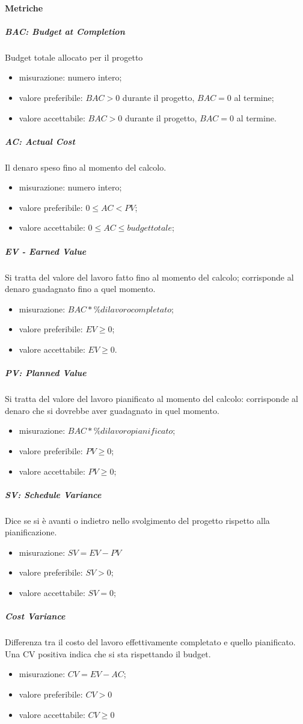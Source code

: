 		\paragraph{Metriche}
			\subparagraph{BAC: Budget at Completion}
			Budget totale allocato per il progetto
			\begin{itemize}
				\item misurazione: numero intero;
				\item valore preferibile: $BAC>0$ durante il progetto, $BAC=0$ al termine;
				\item valore accettabile: $BAC>0$ durante il progetto, $BAC=0$ al termine.
			\end{itemize}
			\subparagraph{AC: Actual Cost}
			Il denaro speso fino al momento del calcolo.
			\begin{itemize}
				\item  misurazione: numero intero;
				\item  valore preferibile: $0 \leq AC < PV$;
				\item  valore accettabile: $0 \leq AC \leq budget totale$;
			\end{itemize}
			\subparagraph{EV - Earned Value}
			Si tratta del valore del lavoro fatto fino al momento del calcolo; corrisponde al denaro guadagnato fino a quel momento.
			\begin{itemize}
				\item  misurazione: $BAC * \% di lavoro completato$;
				\item  valore preferibile: $EV \geq 0$;
				\item  valore accettabile: $EV \geq 0$.
			\end{itemize}
			\subparagraph{PV: Planned Value}
			Si tratta del valore del lavoro pianificato al momento del calcolo: corrisponde al denaro che si dovrebbe aver guadagnato in quel momento.
			\begin{itemize}
				\item  misurazione: $BAC * \% di lavoro pianificato$;
				\item  valore preferibile: $PV \geq 0$;
				\item  valore accettabile: $PV \geq 0$;
			\end{itemize}			
			\subparagraph{SV: Schedule Variance}
			Dice se si è avanti o indietro nello svolgimento del progetto rispetto alla pianificazione.
			\begin{itemize}
				\item misurazione: $SV = EV - PV$
				\item valore preferibile: $SV > 0$;
				\item valore accettabile: $SV = 0$;
			\end{itemize}
			\subparagraph{Cost Variance}
			Differenza tra il costo del lavoro effettivamente completato e quello pianificato. Una CV positiva indica che si sta rispettando il budget.
			\begin{itemize}
				\item misurazione: $CV = EV - AC$;
				\item valore preferibile: $CV > 0$
				\item valore accettabile: $CV \geq 0$
			\end{itemize}
		
